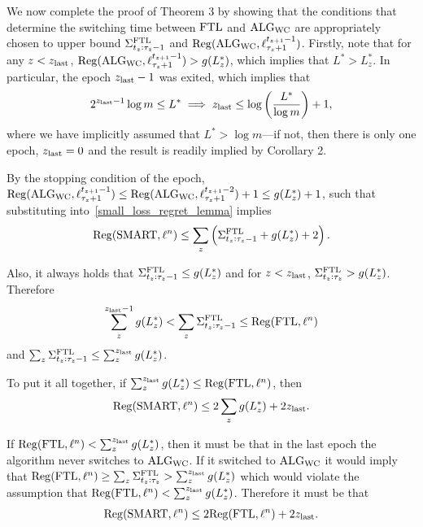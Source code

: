 We now complete the proof of Theorem 3 by showing that the conditions that determine the switching time between $\text{FTL}$ and $\text{ALG}_{\text{WC}}$ are appropriately chosen to upper bound $\Sigma^{\text{FTL}}_{t_z:\tau_z-1}$ and $\mathrm{Reg}(\text{ALG}_{\text{WC}}, \ell_{\tau_z+1}^{t_{z+1}-1})$.
Firstly, note that for any $z < z_{\mathrm{last}}$, $\mathrm{Reg}(\text{ALG}_{\text{WC}}, \ell_{\tau_z+1}^{t_{z+1}-1}) > g(L_z^*)$, which implies that $L^* > L_z^*$. In particular, the epoch $z_{\mathrm{last}}-1$ was exited, which implies that 
\[
2^{z_{\mathrm{last}}-1} \log m \le L^* \implies z_{\mathrm{last}} \le \log\left(\frac{L^*}{\log m}\right) + 1,
\]
where we have implicitly assumed that $L^* > \log m$---if not, then there is only one epoch, $z_{\mathrm{last}} = 0$ and the result is readily implied by Corollary 2.

By the stopping condition of the epoch, $\mathrm{Reg}(\text{ALG}_{\text{WC}}, \ell_{\tau_z+1}^{t_{z+1}-1}) \leq \mathrm{Reg}(\text{ALG}_{\text{WC}}, \ell_{\tau_z+1}^{t_{z+1}-2}) + 1 \leq g(L_z^*) + 1$, such that substituting into~\cref{small_loss_regret_lemma} implies
\begin{align}
\mathrm{Reg}(\text{SMART}, \ell^n)  \leq \sum_z \left(\Sigma^{\text{FTL}}_{t_z:\tau_z-1} + g(L_z^*) + 2\right).
\end{align}


Also, it always holds that $\Sigma^{\text{FTL}}_{t_z:\tau_z-1} \leq g(L_z^*)$ and for $z < z_{\mathrm{last}}$, $\Sigma^{\text{FTL}}_{t_z:\tau_z} > g(L_z^*)$. Therefore 
\[\sum_z^{z_{\mathrm{last}}-1} g(L_z^*) < \sum_z \Sigma^{\text{FTL}}_{t_z:\tau_z-1} \leq \mathrm{Reg}(\text{FTL}, \ell^n)\]
and $\sum_z \Sigma^{\text{FTL}}_{t_z:\tau_z-1} \leq \sum_z^{z_{\mathrm{last}}} g(L_z^*)$.

To put it all together, if $\sum_z^{z_{\mathrm{last}}} g(L_z^*) \leq \mathrm{Reg}(\text{FTL},\ell^n)$, then 
\begin{align}
\mathrm{Reg}(\text{SMART}, \ell^n)  \leq 2 \sum_z g(L_z^*) + 2 z_{\mathrm{last}}.
\end{align}

If $\mathrm{Reg}(\text{FTL},\ell^n) < \sum_z^{z_{\mathrm{last}}} g(L_z^*)$, then it must be that in the last epoch the algorithm never switches to $\text{ALG}_{\text{WC}}$. If it switched to $\text{ALG}_{\text{WC}}$ it would imply that $\mathrm{Reg}(\text{FTL},\ell^n) \geq \sum_z \Sigma^{\text{FTL}}_{t_z:\tau_z} > \sum_z^{z_{\mathrm{last}}} g(L_z^*)$ which would violate the assumption that $\mathrm{Reg}(\text{FTL},\ell^n) < \sum_z^{z_{\mathrm{last}}} g(L_z^*)$. Therefore it must be that
\begin{align}
\mathrm{Reg}(\text{SMART}, \ell^n)  \leq 2 \mathrm{Reg}(\text{FTL}, \ell^n) + 2 z_{\mathrm{last}}.
\end{align}

